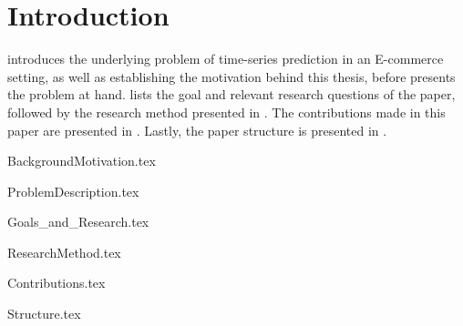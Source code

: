 \chapter{Introduction}
\label{cha:Introduction}

introduces the underlying problem of time-series prediction in an E-commerce setting,
as well as establishing the motivation behind this thesis,
before 
presents the problem at hand.
 lists the goal and relevant research questions of the paper,
followed by the research method presented in .
The contributions made in this paper are presented in .
Lastly, the paper structure is presented in .



{BackgroundMotivation.tex}

{ProblemDescription.tex}

{Goals_and_Research.tex}

{ResearchMethod.tex}

{Contributions.tex}

{Structure.tex}
